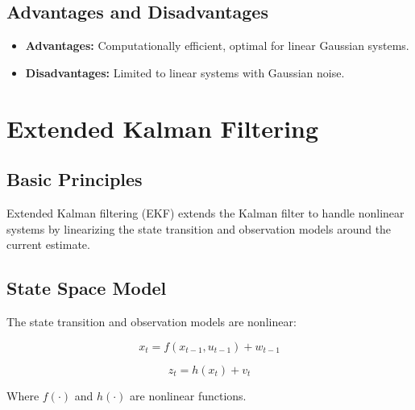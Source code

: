 \documentclass{article}
\begin{document}
\subsection{Advantages and Disadvantages}
\begin{itemize}
    \item \textbf{Advantages:} Computationally efficient, optimal for linear Gaussian systems.
    \item \textbf{Disadvantages:} Limited to linear systems with Gaussian noise.
\end{itemize}

\section{Extended Kalman Filtering}

\subsection{Basic Principles}
Extended Kalman filtering (EKF) extends the Kalman filter to handle nonlinear systems by linearizing the state transition and observation models around the current estimate.

\subsection{State Space Model}
The state transition and observation models are nonlinear:

\begin{equation}
x_t = f(x_{t-1}, u_{t-1}) + w_{t-1}
\end{equation}

\begin{equation}
z_t = h(x_t) + v_t
\end{equation}

Where \( f(\cdot) \) and \( h(\cdot) \) are nonlinear functions.
\end{document}
